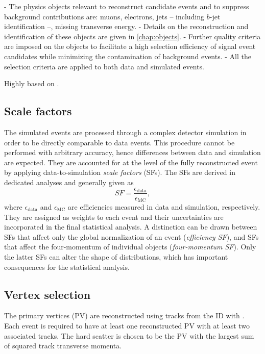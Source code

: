 - The physics objects relevant to reconstruct \HWWdet candidate events and to suppress background contributions are: muons, electrons, jets -- including $b$-jet identification --, missing transverse energy. 
- Details on the reconstruction and identification of these objects are given in \cref{chap:objects}.
- Further quality criteria are imposed on the objects to facilitate a high selection efficiency of signal event candidates while minimizing the contamination of background events.
- All the selection criteria are applied to both data and simulated events.

Highly based on .

\subsection{Scale factors}
The simulated events are processed through a complex detector simulation in order to be directly comparable to data events. This procedure cannot be performed with arbitrary accuracy, hence differences between data and simulation are expected. They are accounted for at the level of the fully reconstructed event by applying data-to-simulation \emph{scale factors} (SFs). The SFs are derived in dedicated analyses and generally given as 
\begin{equation}
    SF = \frac{\epsilon_\text{data}}{\epsilon_{\text{MC}}},
\end{equation}
where $\epsilon_\text{data}$ and $\epsilon_\text{MC}$ are efficiencies measured in data and simulation, respectively. 
They are assigned as weights to each event and their uncertainties are incorporated in the final statistical analysis. 
A distinction can be drawn between SFs that affect only the global normalization of an event (\emph{efficiency SF}), and SFs that affect the four-momentum of individual objects (\emph{four-momentum SF}). Only the latter SFs can alter the shape of distributions, which has important consequences for the statistical analysis. 

\subsection{Vertex selection}
The primary vertices (PV) are reconstructed using tracks from the ID with \MeV. Each event is required to have at least one reconstructed PV with at least two associated tracks. The hard scatter is chosen to be the PV with the largest sum of squared track transverse momenta. 


